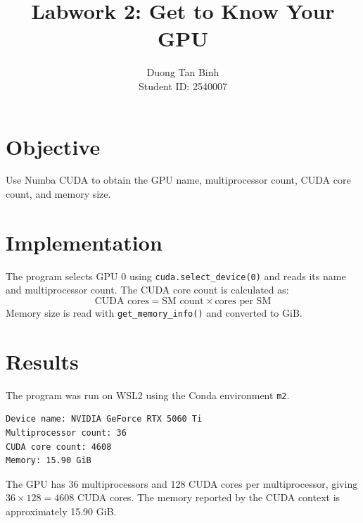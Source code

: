 \documentclass[11pt,a4paper]{article}
\title{Labwork 2: Get to Know Your GPU}
\author{Duong Tan Binh \\ Student ID: 2540007}
\date{}
\begin{document}
\maketitle

\section{Objective}
Use Numba CUDA to obtain the GPU name, multiprocessor count, CUDA core
count, and memory size.

\section{Implementation}
The program selects GPU 0 using \texttt{cuda.select\_device(0)} and reads
its name and multiprocessor count. The CUDA core count is calculated as:
\[
\text{CUDA cores} = \text{SM count} \times \text{cores per SM}
\]
Memory size is read with \texttt{get\_memory\_info()} and converted to GiB.

\section{Results}
The program was run on WSL2 using the Conda environment \texttt{m2}.
\begin{verbatim}
Device name: NVIDIA GeForce RTX 5060 Ti
Multiprocessor count: 36
CUDA core count: 4608
Memory: 15.90 GiB
\end{verbatim}
The GPU has 36 multiprocessors and 128 CUDA cores per multiprocessor,
giving $36 \times 128 = 4608$ CUDA cores. The memory reported by the
CUDA context is approximately 15.90 GiB.
\end{document}
